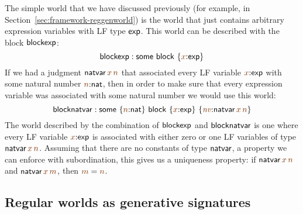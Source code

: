 The simple world that we have discussed previously (for
example, in Section~\ref{sec:framework-reggenworld}) is the
world that just contains arbitrary expression variables with LF type
${\sf exp}$. This world can be described with the block ${\sf blockexp}$:
\[
 {\sf blockexp} : 
 {\sf some}
~{\sf block}~\{{\lf x}{:}{\sf exp}\}
\]
If we had a judgment ${\sf natvar}\,\lf{x}\,\lf{n}$ that associated
every LF variable $\lf{x}{:}{\sf exp}$ with some natural number
$\lf{n}{:}{\sf nat}$, then in order to make sure that every expression
variable was associated with some natural number we would use this
world:
\[
 {\sf blocknatvar} : 
 {\sf some}~\{{\lf n}{:}{\sf nat}\}
~{\sf block}~\{{\lf x}{:}{\sf exp}\}~
               \{\lf{\it nv}{:}{\sf natvar}\,\lf{x}\,\lf{n}\}
\]
The world described by the combination of ${\sf blockexp}$ and ${\sf
  blocknatvar}$ is one where every LF variable $\lf{x}{:}{\sf exp}$
is associated with either zero or one LF variables of type ${\sf
  natvar}\,\lf{x}\,\lf{n}$. Assuming that there are no constants of
type ${\sf natvar}$, a property we can enforce with subordination, this
gives us a uniqueness property: if ${\sf natvar}\,\lf{x}\,\lf{n}$ and
${\sf natvar}\,\lf{x}\,\lf{m}$, then $\lf{m} = \lf{n}$. 

\subsection{Regular worlds as generative signatures}

